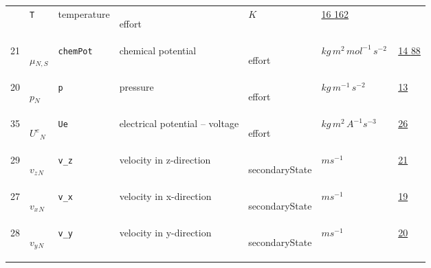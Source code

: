 \begin{longtable}{|p{1cm}|p{2.5cm}|p{4.5cm}|p{8cm}|p{3.0cm}|p{3cm}|p{1cm}|}
             & \verb|T|
             & temperature
             & \begin{lay}effort \end{lay}
             & $ K \, $
             &                 \hyperlink{"e:16"}{ 16 }
                                 \hyperlink{"e:162"}{ 162 }
                 \\
            21
             & \hypertarget{"v:21"}{ $ {{\mu}}{_{N, S}} $}
             & \verb|chemPot|
             & chemical potential
             & \begin{lay}effort \end{lay}
             & $ kg \,m^{2} \,mol^{-1} \,s^{-2} \, $
             &                 \hyperlink{"e:14"}{ 14 }
                                 \hyperlink{"e:88"}{ 88 }
                 \\
            20
             & \hypertarget{"v:20"}{ $ {p}{_{N}} $}
             & \verb|p|
             & pressure
             & \begin{lay}effort \end{lay}
             & $ kg \,m^{-1} \,s^{-2} \, $
             &                 \hyperlink{"e:13"}{ 13 }
                 \\
            35
             & \hypertarget{"v:35"}{ $ {{U^e}}{_{N}} $}
             & \verb|Ue|
             & electrical potential -- voltage
             & \begin{lay}effort \end{lay}
             & $ kg \,m^{2} \,A^{-1} s^{-3} \, $
             &                 \hyperlink{"e:26"}{ 26 }
                 \\
            29
             & \hypertarget{"v:29"}{ $ {{v_z}}{_{N}} $}
             & \verb|v_z|
             & velocity in z-direction
             & \begin{lay}secondaryState \end{lay}
             & $ m s^{-1} \, $
             &                 \hyperlink{"e:21"}{ 21 }
                 \\
            27
             & \hypertarget{"v:27"}{ $ {{v_x}}{_{N}} $}
             & \verb|v_x|
             & velocity in x-direction
             & \begin{lay}secondaryState \end{lay}
             & $ m s^{-1} \, $
             &                 \hyperlink{"e:19"}{ 19 }
                 \\
            28
             & \hypertarget{"v:28"}{ $ {{v_y}}{_{N}} $}
             & \verb|v_y|
             & velocity in y-direction
             & \begin{lay}secondaryState \end{lay}
             & $ m s^{-1} \, $
             &                 \hyperlink{"e:20"}{ 20 }
                 \\
    \end{longtable}